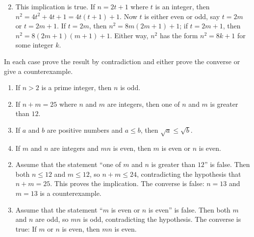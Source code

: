 \begin{multicols}{2}
\begin{ex}
\begin{enumerate}[label={\alph*.}]
\end{enumerate}
\begin{sol}
\begin{enumerate}[label={\alph*.}]
\setcounter{enumi}{1}
\item  This implication is true. If $n = 2t + 1$ where $t$ is an integer, then $n^{2} = 4t^{2} + 4t + 1 = 4t(t + 1) + 1$. Now $t$ is either even or odd, say $t = 2m$ or $t = 2m + 1$. If $t = 2m$, then $n^{2} = 8m(2m + 1) + 1$; if $t = 2m + 1$, then $n^{2} = 8(2m + 1)(m + 1) + 1$. Either way, $n^{2}$ has the form $n^{2} = 8k + 1$ for some integer $k$.

\end{enumerate}
\end{sol}
\end{ex}

\begin{ex}
In each case prove the result by contradiction and either prove the converse or give a counterexample.


\begin{enumerate}[label={\alph*.}]
\item If $n > 2$ is a prime integer, then $n$ is odd.

\item If $n + m = 25$ where $n$ and $m$ are integers, then one of $n$ and $m$ is greater than $12$.

\item If $a$ and $b$ are positive numbers and $a \leq b$, then $\sqrt{a} \leq \sqrt{b}$.

\item If $m$ and $n$ are integers and $mn$ is even, then $m$ is even or $n$ is even.

\end{enumerate}
\begin{sol}
\begin{enumerate}[label={\alph*.}]
\setcounter{enumi}{1}
\item  Assume that the statement ``one of $m$ and $n$ is greater than $12$'' is false. Then both $n \leq 12$ and $m \leq 12$, so $n + m \leq 24$, contradicting the hypothesis that $n + m = 25$. This proves the implication. The converse is false: $n = 13$ and $m = 13$ is a counterexample.

\setcounter{enumi}{3}
\item  Assume that the statement ``$m$ is even or $n$ is even'' is false. Then both $m$ and $n$ are odd, so $mn$ is odd, contradicting the hypothesis. The converse is true: If $m$ or $n$ is even, then $mn$ is even.


\end{enumerate}
\end{sol}
\end{ex}
\end{multicols}
